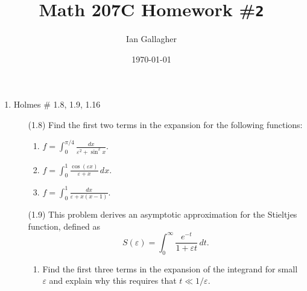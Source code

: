 \documentclass[11pt]{article}
\title{Math 207C Homework \#\texttt{2}}
\author{Ian Gallagher}
\date{\today}
\theoremstyle{problemstyle}
\begin{document}
\maketitle

\begin{enumerate}
    \item Holmes \# 1.8, 1.9, 1.16
      \begin{enumerate}
        \item[(1.8)] Find the first two terms in the expansion for the following
          functions:
          \begin{enumerate}
              \item \( f = \displaystyle\int_0^{\pi/4}
                \frac{dx}{\varepsilon^2 + \sin^2 x}. \)
              \item \( f = \displaystyle\int_0^1 \frac{\cos(\varepsilon
                x)}{\varepsilon + x} \, dx. \)
              \item \( f = \displaystyle\int_0^1 \frac{dx}{\varepsilon +
                x(x - 1)}. \)
          \end{enumerate}
        \item[(1.9)] This problem derives an asymptotic approximation for the
          Stieltjes function, defined as
          \[
            S(\varepsilon) = \int_0^\infty \frac{e^{-t}}{1 + \varepsilon t} \,
            dt.
          \]
          \begin{enumerate}
            \item Find the first three terms in the expansion of the
              integrand for small $\varepsilon$ and explain why this requires
              that $t \ll 1/\varepsilon$.
            

\end{enumerate}
\end{enumerate}
\end{enumerate}
\end{document}
